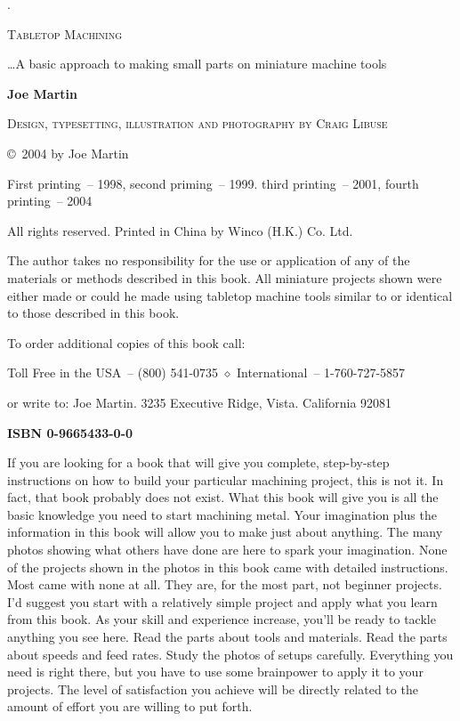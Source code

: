 \begin{titlepage}

\begin{centering}

.

{\Huge\bigskip\textsc{Tabletop Machining}\bigskip}

{\Large \ldots A basic approach to making small parts on miniature machine
tools}

{\Huge \bigskip \textbf{Joe Martin} \bigskip}

{\large \bigskip \textsc{Design, typesetting, illustration and photography by
Craig Libuse } \bigskip}

\bigskip

\copyright\ 2004 by Joe Martin

\bigskip
First printing\ -- 1998, second priming\ -- 1999. third printing\ -- 2001,
fourth printing\ -- 2004

\bigskip
All rights reserved. Printed in China by Winco (H.K.) Co. Ltd.

\bigskip
The author takes no responsibility for the use or application of any of the
materials or methods described in this book. All miniature projects shown were
either made or could he made using tabletop machine tools similar to or
identical to those described in this book.

\bigskip
To order additional copies of this book call:

Toll Free in the USA\ -- (800) 541-0735 $\diamond$ International\
-- 1-760-727-5857 

or write to: Joe Martin. 3235 Executive Ridge, Vista.
California 92081

\bigskip
{\Large \textbf{ISBN 0-9665433-0-0}}

\end{centering}

\end{titlepage}

\secdown\secdown


If you are looking for a book that will give you complete, step-by-step
instructions on how to build your particular machining project, this is not it.
In fact, that book probably does not exist. What this book will give you is all
the basic knowledge you need to start machining metal. Your imagination plus the
information in this book will allow you to make just about anything. The many
photos showing what others have done are here to spark your imagination. None of
the projects shown in the photos in this book came with detailed instructions.
Most came with none at all. They are, for the most part, not beginner projects.
I'd suggest you start with a relatively simple project and apply what you learn
from this book. As your skill and experience increase, you'll be ready to tackle
anything you see here. Read the parts about tools and materials. Read the parts
about speeds and feed rates. Study the photos of setups carefully. Everything
you need is right there, but you have to use some brainpower to apply it to your
projects. The level of satisfaction you achieve will be directly related to the
amount of effort you are willing to put forth.

